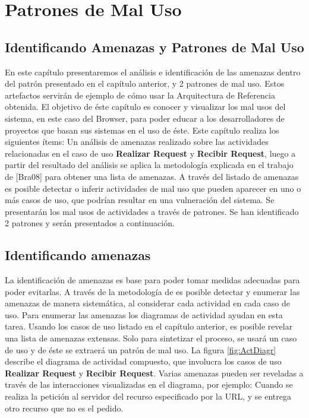 \chapter{Patrones de Mal Uso}
\label{chap6:Misuse}


\section{Identificando Amenazas y Patrones de Mal Uso}
En este capítulo presentaremos el análisis e identificación de las amenazas dentro del patrón presentado en el capítulo anterior, y 2 patrones de mal uso. Estos artefactos servirán de ejemplo de cómo usar la Arquitectura de Referencia obtenida. El objetivo de éste capítulo es conocer y visualizar los mal usos del sistema, en este caso del Browser, para poder educar a los desarrolladores de proyectos que basan sus sistemas en el uso de éste.
Este capítulo realiza los siguientes ítems: Un análisis de amenazas realizado sobre las actividades relacionadas en el caso de uso \textbf{Realizar Request} y \textbf{Recibir Request}, luego a partir del resultado del análisis se aplica la metodología explicada en el trabajo de [Bra08] para obtener una lista de amenazas. A través del listado de amenazas es posible detectar o inferir actividades de mal uso que pueden aparecer en uno o más casos de uso, que podrían resultar en una vulneración del sistema. Se presentarán los mal usos de actividades a través de patrones. Se han identificado 2 patrones y serán presentados a continuación.

\section{Identificando amenazas}
La identificación de amenazas es base para poder tomar medidas adecuadas para poder evitarlas. A través de la metodología de \cite{braz2008eliciting} es posible detectar y enumerar las amenazas de manera sistemática, al considerar cada actividad en cada caso de uso. Para enumerar las amenazas los diagramas de actividad ayudan en esta tarea.
Usando los casos de uso listado en el capítulo anterior, es posible revelar una lista de amenazas extensas. Solo para sintetizar el proceso, se usará un caso de uso y de éste se extraerá un patrón de mal uso.
La figura \ref{fig:ActDiagr} describe el diagrama de actividad compuesto, que involucra los casos de uso \textbf{Realizar Request} y \textbf{Recibir Request}. Varias amenazas pueden ser reveladas a través de las interacciones visualizadas en el diagrama, por ejemplo: Cuando se realiza la petición al servidor del recurso especificado por la URL, y se entrega otro recurso que no es el pedido. 

